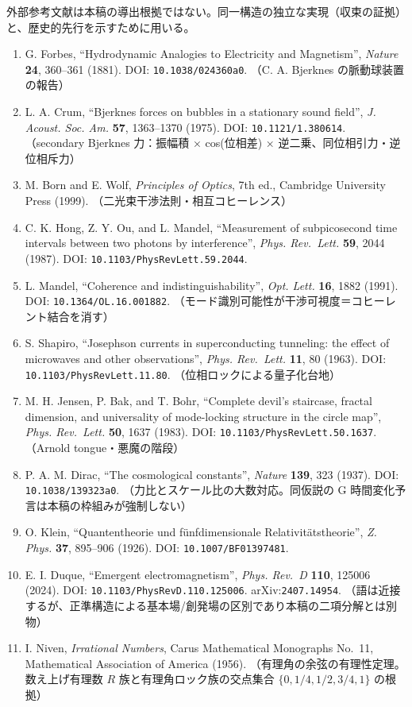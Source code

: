 \documentclass[
  a4paper,
]{ltjsarticle}
\providecommand{\tightlist}{%
  \setlength{\itemsep}{0pt}\setlength{\parskip}{0pt}}
\begin{document}
外部参考文献は本稿の導出根拠ではない。同一構造の独立な実現（収束の証拠）と、歴史的先行を示すために用いる。

\begin{enumerate}
\def\labelenumi{\arabic{enumi}.}
\setcounter{enumi}{6}
\tightlist
\item
  G. Forbes, ``Hydrodynamic Analogies to Electricity and Magnetism'',
  \emph{Nature} \textbf{24}, 360--361 (1881). DOI:
  \texttt{10.1038/024360a0}. （C. A. Bjerknes の脈動球装置の報告）
\item
  L. A. Crum, ``Bjerknes forces on bubbles in a stationary sound
  field'', \emph{J. Acoust. Soc. Am.} \textbf{57}, 1363--1370 (1975).
  DOI: \texttt{10.1121/1.380614}. （secondary Bjerknes 力：振幅積 ×
  cos(位相差) × 逆二乗、同位相引力・逆位相斥力）
\item
  M. Born and E. Wolf, \emph{Principles of Optics}, 7th ed., Cambridge
  University Press (1999). （二光束干渉法則・相互コヒーレンス）
\item
  C. K. Hong, Z. Y. Ou, and L. Mandel, ``Measurement of subpicosecond
  time intervals between two photons by interference'', \emph{Phys.
  Rev.~Lett.} \textbf{59}, 2044 (1987). DOI:
  \texttt{10.1103/PhysRevLett.59.2044}.
\item
  L. Mandel, ``Coherence and indistinguishability'', \emph{Opt. Lett.}
  \textbf{16}, 1882 (1991). DOI: \texttt{10.1364/OL.16.001882}.
  （モード識別可能性が干渉可視度＝コヒーレント結合を消す）
\item
  S. Shapiro, ``Josephson currents in superconducting tunneling: the
  effect of microwaves and other observations'', \emph{Phys. Rev.~Lett.}
  \textbf{11}, 80 (1963). DOI: \texttt{10.1103/PhysRevLett.11.80}.
  （位相ロックによる量子化台地）
\item
  M. H. Jensen, P. Bak, and T. Bohr, ``Complete devil's staircase,
  fractal dimension, and universality of mode-locking structure in the
  circle map'', \emph{Phys. Rev.~Lett.} \textbf{50}, 1637 (1983). DOI:
  \texttt{10.1103/PhysRevLett.50.1637}. （Arnold tongue・悪魔の階段）
\item
  P. A. M. Dirac, ``The cosmological constants'', \emph{Nature}
  \textbf{139}, 323 (1937). DOI: \texttt{10.1038/139323a0}.
  （力比とスケール比の大数対応。同仮説の G
  時間変化予言は本稿の枠組みが強制しない）
\item
  O. Klein, ``Quantentheorie und fünfdimensionale Relativitätstheorie'',
  \emph{Z. Phys.} \textbf{37}, 895--906 (1926). DOI:
  \texttt{10.1007/BF01397481}.
\item
  E. I. Duque, ``Emergent electromagnetism'', \emph{Phys. Rev.~D}
  \textbf{110}, 125006 (2024). DOI:
  \texttt{10.1103/PhysRevD.110.125006}. arXiv:\texttt{2407.14954}.
  （語は近接するが、正準構造による基本場/創発場の区別であり本稿の二項分解とは別物）
\item
  I. Niven, \emph{Irrational Numbers}, Carus Mathematical Monographs
  No.~11, Mathematical Association of America (1956).
  （有理角の余弦の有理性定理。数え上げ有理数 \(R\)
  族と有理角ロック族の交点集合 \(\{0,1/4,1/2,3/4,1\}\) の根拠）
\end{enumerate}
\end{document}
